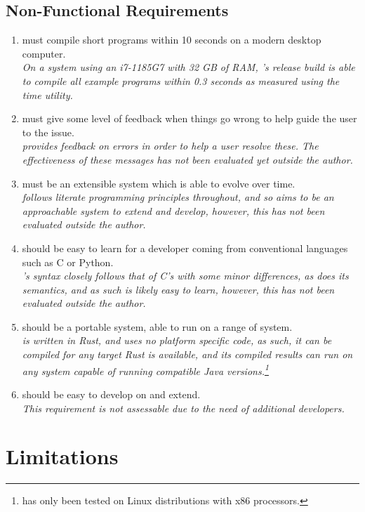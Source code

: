 \subsection{Non-Functional Requirements}

\begin{enumerate}
    \item \rimp must compile short programs within 10 seconds on a modern desktop computer. \\
    \textit{On a system using an i7-1185G7 with 32 GB of RAM, \rimp's release build is able to compile all example programs within 0.3 seconds as measured using the time utility\cite{time}.}
    \item \rimp must give some level of feedback when things go wrong to help guide the user to the issue. \\
    \textit{\rimp provides feedback on errors in order to help a user resolve these. The effectiveness of these messages has not been evaluated yet outside the author.}
    \item \rimp must be an extensible system which is able to evolve over time. \\
    \textit{\rimp follows literate programming principles throughout, and so aims to be an approachable system to extend and develop, however, this has not been evaluated outside the author.}
    \item \rimp should be easy to learn for a developer coming from conventional languages such as C or Python. \\
    \textit{\rimp's syntax closely follows that of C's with some minor differences, as does its semantics, and as such is likely easy to learn, however, this has not been evaluated outside the author.}
    \item \rimp should be a portable system, able to run on a range of system. \\
    \textit{\rimp is written in Rust, and uses no platform specific code, as such, it can be compiled for any target Rust is available, and its compiled results can run on any system capable of running compatible Java versions.\footnote{\rimp has only been tested on Linux distributions with x86 processors.}}
    \item \rimp should be easy to develop on and extend. \\
    \textit{This requirement is not assessable due to the need of additional developers.}
\end{enumerate}
\newpage
\section{Limitations}

